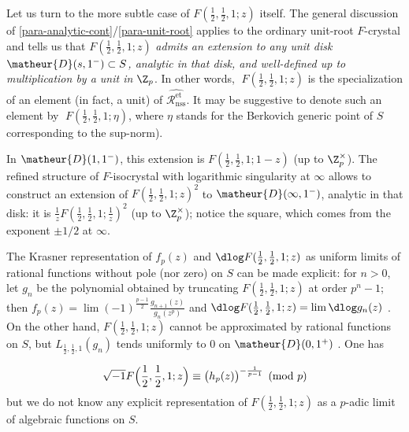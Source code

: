 \begin{para}
 Let us turn to the more subtle case of $F(\frac{1}{2},\frac{1}{2},1;z)$
 itself. The general discussion of
 \ref{para-analytic-cont}/\ref{para-unit-root} applies to the ordinary
 unit-root $F$-crystal and tells us that $F(\frac{1}{2},\frac{1}{2},1;z)$
 \emph{admits an extension to any unit disk $\matheur{D}(s,1^-) \subset S$,
 analytic in that disk, and well-defined up to multiplication by a unit
 in ${\Z}_p$}. In other words, $\;F(\frac{1}{2},\frac{1}{2},1;z)$ is the
 specialization of an element (in fact, a unit) of
 $\widehat{\mathcal{R}^{\mathrm{et}}_{\mathrm{nss}}}$.
 It may be suggestive to denote
 such an element by $\;F(\frac{1}{2},\frac{1}{2},1;\eta)$, where $\eta$
 stands for the Berkovich generic point of $S$ corresponding to the
 sup-norm).

 \noindent In $\matheur{D}(1,1^-)$, this extension is
 $F(\frac{1}{2},\frac{1}{2},1;1-z)$ (up to $\Z_p^{\times}$). The
 refined structure of $F$-isocrystal with logarithmic singularity at
 $\infty$ allows to construct an extension of
 $F(\frac{1}{2},\frac{1}{2},1;z)^2$ to $\matheur{D}(\infty,1^-)$,
 analytic in that disk: it is $\frac{1}{z} F(\frac{1}{2},\frac{1}{2},1;\frac{1}{z})^2$ (up to $\Z_p^{\times}$); notice the
 square, which comes from the exponent $\pm 1/2$ at $\infty$.
\end{para}

\begin{para}
 The Krasner representation of $f_p(z)$ and $\dlog
 F(\frac{1}{2},\frac{1}{2},1;z)$ as uniform limits of rational functions
 without pole (nor zero) on $S$ can be made explicit: for $n>0$, let
 $g_n$ be the polynomial obtained by truncating
 $F(\frac{1}{2},\frac{1}{2},1;z)$ at order $p^n-1$; then $f_p(z)= \lim
 (-1)^{\frac{p-1}{2}}\frac{g_{n+1}(z)}{g_n(z^p)}$ and $\dlog
 F(\frac{1}{2},\frac{1}{2},1;z)=\lim\dlog g_n(z)$ \cite[3.4]{pc}.  On
 the other hand, $F(\frac{1}{2},\frac{1}{2},1;z)$ cannot be approximated
 by rational functions on $S$, but $L_{\frac{1}{2},\frac{1}{2},1}(g_n)$
 tends uniformly to $0$ on $\matheur{D}(0,1^+)$ \cite{sbdsdlaafh}.  One
 has

\begin{equation*}
\sqrt{-1}F\Bigl(\frac{1}{2},\frac{1}{2},1;z\Bigr) \equiv
 \bigl(h_p(z)\bigr)^{-\frac{1}{p-1}}
\pmod{p}
\end{equation*}
but we do not know any explicit representation of 
$F(\frac{1}{2},\frac{1}{2},1;z)$ as a $p$-adic limit of algebraic
functions on $S$.
\end{para}

